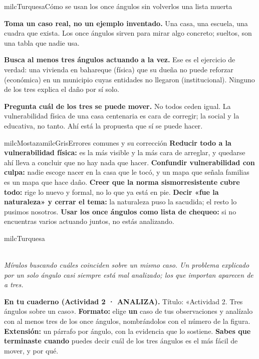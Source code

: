 \documentclass[11pt,letterpaper]{article}
\newcommand{\guiaDiagrama}[2]{%
\begin{center}
\\[1.5mm]
{\footnotesize\itshape\textcolor{milcNegro!75}{#2}}
\end{center}
}
\begin{document}
\begin{drawbox}{milcTurquesa}{Cómo se usan los once ángulos sin volverlos una lista muerta}
\begin{pasoslista}
\item \textbf{Toma un caso real, no un ejemplo inventado.} Una casa, una escuela, una cuadra que exista. Los once ángulos sirven para mirar algo concreto; sueltos, son una tabla que nadie usa.
\item \textbf{Busca al menos tres ángulos actuando a la vez.} Ese es el ejercicio de verdad: una vivienda en bahareque (física) que su dueña no puede reforzar (económica) en un municipio cuyas entidades no llegaron (institucional). Ninguno de los tres explica el daño por sí solo.
\item \textbf{Pregunta cuál de los tres se puede mover.} No todos ceden igual. La vulnerabilidad física de una casa centenaria es cara de corregir; la social y la educativa, no tanto. Ahí está la propuesta que sí se puede hacer.
\end{pasoslista}
\end{drawbox}

\begin{softbox}{milcMostaza}{milcGris}{Errores comunes y su corrección}
\textbf{Reducir todo a la vulnerabilidad física:} es la más visible y la más cara de arreglar, y quedarse ahí lleva a concluir que no hay nada que hacer. \textbf{Confundir vulnerabilidad con culpa:} nadie escoge nacer en la casa que le tocó, y un mapa que señala familias es un mapa que hace daño. \textbf{Creer que la norma sismorresistente cubre todo:} rige lo nuevo y formal, no lo que ya está en pie. \textbf{Decir «fue la naturaleza» y cerrar el tema:} la naturaleza puso la sacudida; el resto lo pusimos nosotros. \textbf{Usar los once ángulos como lista de chequeo:} si no encuentras varios actuando juntos, no estás analizando.
\end{softbox}

\begin{infoband}{milcTurquesa}
\guiaDiagrama{assets/10-8/once-angulos.tikz}{Míralos buscando cuáles coinciden sobre un mismo caso. Un problema explicado por un solo ángulo casi siempre está mal analizado; los que importan aparecen de a tres.}

\textbf{En tu cuaderno (Actividad 2 · ANALIZA).} Título: «Actividad 2. Tres ángulos sobre un caso». \textbf{Formato:} elige \textbf{un} caso de tus observaciones y analízalo con al menos tres de los once ángulos, nombrándolos con el número de la figura. \textbf{Extensión:} un párrafo por ángulo, con la evidencia que lo sostiene. \textbf{Sabes que terminaste cuando} puedes decir cuál de los tres ángulos es el más fácil de mover, y por qué.
\end{infoband}
\end{document}
